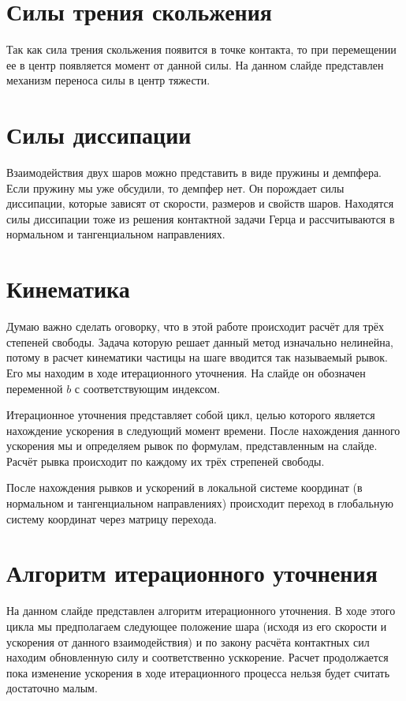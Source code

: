 \documentclass[a4paper]{article}
\begin{document}
\section{Силы трения скольжения}

Так как сила трения скольжения появится в точке контакта, то при перемещении ее в центр появляется момент от данной силы.
На данном слайде представлен механизм переноса силы в центр тяжести.

\section{Силы диссипации}

Взаимодействия двух шаров можно представить в виде пружины и демпфера.
Если пружину мы уже обсудили, то демпфер нет.
Он порождает силы диссипации, которые зависят от скорости, размеров и свойств шаров.
Находятся силы диссипации тоже из решения контактной задачи Герца и рассчитываются в нормальном и тангенциальном направлениях.

\section{Кинематика}

Думаю важно сделать оговорку, что в этой работе происходит расчёт для трёх степеней свободы.
Задача которую решает данный метод изначально нелинейна, потому в расчет кинематики частицы на шаге вводится так называемый рывок.
Его мы находим в ходе итерационного уточнения.
На слайде он обозначен переменной $b$ с соответствующим индексом.

Итерационное уточнения представляет собой цикл, целью которого является нахождение ускорения в следующий момент времени.
После нахождения данного ускорения мы и определяем рывок по формулам, представленным на слайде.
Расчёт рывка происходит по каждому их трёх стрепеней свободы.

После нахождения рывков и ускорений в локальной системе координат (в нормальном и тангенциальном направлениях) происходит переход в глобальную систему координат через матрицу перехода.

\section{Алгоритм итерационного уточнения}

На данном слайде представлен алгоритм итерационного уточнения.
В ходе этого цикла мы предполагаем следующее положение шара (исходя из его скорости и ускорения от данного взаимодействия) и по закону расчёта контактных сил находим обновленную силу и соответственно усккорение.
Расчет продолжается пока изменение ускорения в ходе итерационного процесса нельзя будет считать достаточно малым.
\end{document}
